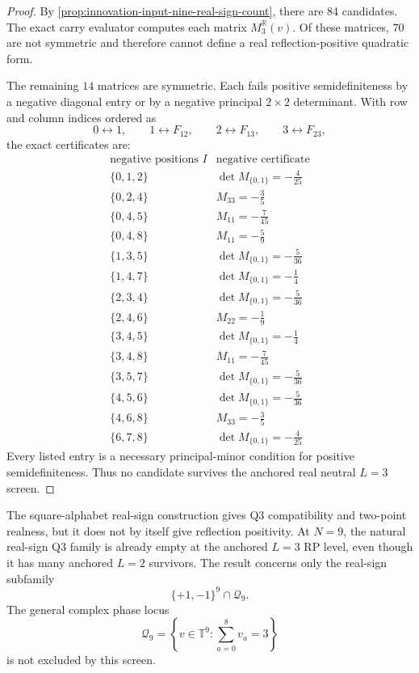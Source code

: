 \begin{proof}
By \autoref{prop:innovation-input-nine-real-sign-count}, there are $84$
candidates. The exact carry evaluator computes each matrix
$M_3^{\mathbb R}(v)$. Of these matrices, $70$ are not symmetric and
therefore cannot define a real reflection-positive quadratic form.

The remaining $14$ matrices are symmetric. Each fails positive
semidefiniteness by a negative diagonal entry or by a negative principal
$2\times2$ determinant. With row and column indices ordered as
$$
0\leftrightarrow1,
\qquad
1\leftrightarrow F_{12},
\qquad
2\leftrightarrow F_{13},
\qquad
3\leftrightarrow F_{23},
$$
the exact certificates are:
$$
\begin{array}{c|c}
\text{negative positions }I & \text{negative certificate}\\
\hline
\{0,1,2\} & \det M_{\{0,1\}}=-\frac4{25}\\
\{0,2,4\} & M_{33}=-\frac35\\
\{0,4,5\} & M_{11}=-\frac7{45}\\
\{0,4,8\} & M_{11}=-\frac59\\
\{1,3,5\} & \det M_{\{0,1\}}=-\frac5{36}\\
\{1,4,7\} & \det M_{\{0,1\}}=-\frac14\\
\{2,3,4\} & \det M_{\{0,1\}}=-\frac5{36}\\
\{2,4,6\} & M_{22}=-\frac19\\
\{3,4,5\} & \det M_{\{0,1\}}=-\frac14\\
\{3,4,8\} & M_{11}=-\frac7{45}\\
\{3,5,7\} & \det M_{\{0,1\}}=-\frac5{36}\\
\{4,5,6\} & \det M_{\{0,1\}}=-\frac5{36}\\
\{4,6,8\} & M_{33}=-\frac35\\
\{6,7,8\} & \det M_{\{0,1\}}=-\frac4{25}
\end{array}
$$
Every listed entry is a necessary principal-minor condition for positive
semidefiniteness. Thus no candidate survives the anchored real neutral
$L=3$ screen.
\end{proof}

\begin{principle}
\label{prin:innovation-input-square-realness-not-rp-positivity}
The square-alphabet real-sign construction gives Q3 compatibility and
two-point realness, but it does not by itself give reflection positivity.
At $N=9$, the natural real-sign Q3 family is already empty at the
anchored $L=3$ RP level, even though it has many anchored $L=2$ survivors.
The result concerns only the real-sign subfamily
$$
\{+1,-1\}^9\cap\mathcal Q_9.
$$
The general complex phase locus
$$
\mathcal Q_9
=
\left\{
v\in\mathbb T^9:
\sum_{a=0}^{8}v_a=3
\right\}
$$
is not excluded by this screen.
\end{principle}
